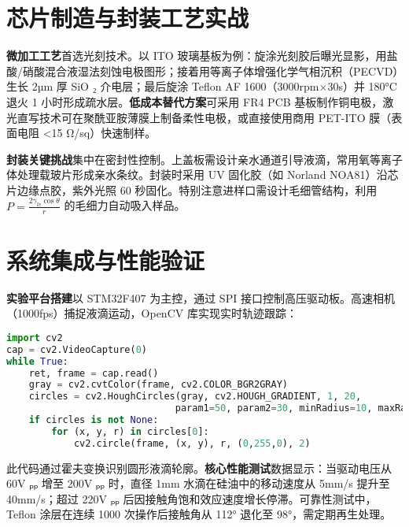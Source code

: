 \chapter{芯片制造与封装工艺实战}
\textbf{微加工工艺}首选光刻技术。以 ITO 玻璃基板为例：旋涂光刻胶后曝光显影，用盐酸/硝酸混合液湿法刻蚀电极图形；接着用等离子体增强化学气相沉积（PECVD）生长 2µm 厚 SiO ₂ 介电层；最后旋涂 Teflon AF 1600（3000rpm×30s）并 180°C 退火 1 小时形成疏水层。\textbf{低成本替代方案}可采用 FR4 PCB 基板制作铜电极，激光直写技术可在聚酰亚胺薄膜上制备柔性电极，或直接使用商用 PET-ITO 膜（表面电阻 <15 Ω/sq）快速制样。\par
\textbf{封装关键挑战}集中在密封性控制。上盖板需设计亲水通道引导液滴，常用氧等离子体处理载玻片形成亲水条纹。封装时采用 UV 固化胶（如 Norland NOA81）沿芯片边缘点胶，紫外光照 60 秒固化。特别注意进样口需设计毛细管结构，利用 $P=\frac{2\gamma_{lv}\cos\theta}{r}$ 的毛细力自动吸入样品。\par
\chapter{系统集成与性能验证}
\textbf{实验平台搭建}以 STM32F407 为主控，通过 SPI 接口控制高压驱动板。高速相机（1000fps）捕捉液滴运动，OpenCV 库实现实时轨迹跟踪：\par
\begin{lstlisting}[language=python]
import cv2
cap = cv2.VideoCapture(0)
while True:
    ret, frame = cap.read()
    gray = cv2.cvtColor(frame, cv2.COLOR_BGR2GRAY)
    circles = cv2.HoughCircles(gray, cv2.HOUGH_GRADIENT, 1, 20, 
                              param1=50, param2=30, minRadius=10, maxRadius=50)
    if circles is not None:
        for (x, y, r) in circles[0]:
            cv2.circle(frame, (x, y), r, (0,255,0), 2)
\end{lstlisting}
此代码通过霍夫变换识别圆形液滴轮廓。\textbf{核心性能测试}数据显示：当驱动电压从 60V ₚₚ 增至 200V ₚₚ 时，直径 1mm 水滴在硅油中的移动速度从 5mm/s 提升至 40mm/s；超过 220V ₚₚ 后因接触角饱和效应速度增长停滞。可靠性测试中，Teflon 涂层在连续 1000 次操作后接触角从 112° 退化至 98°，需定期再生处理。\par

